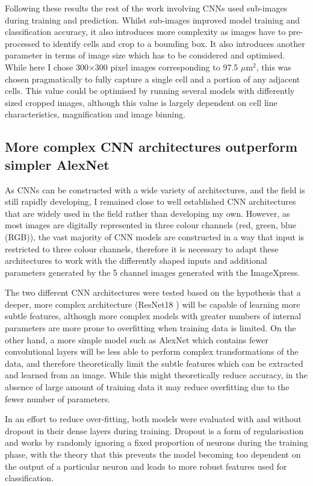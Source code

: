 \documentclass[a4paper,11pt,twoside,openright]{scrbook}
\begin{document}
Following these results the rest of the work involving CNNs used sub-images during training and prediction.
Whilst sub-images improved model training and classification accuracy, it also introduces more complexity as images have to pre-processed to identify cells and crop to a bounding box.
It also introduces another parameter in terms of image size which has to be considered and optimised.
While here I chose 300$\times$300 pixel images corresponding to 97.5 $\mu$m$^2$, this was chosen pragmatically to fully capture a single cell and a portion of any adjacent cells.
This value could be optimised by running several models with differently sized cropped images, although this value is largely dependent on cell line characteristics, magnification and image binning.


\subsection{More complex CNN architectures outperform simpler AlexNet}
As CNNs can be constructed with a wide variety of architectures, and the field is still rapidly developing, I remained close to well established CNN architectures that are widely used in the field rather than developing my own.
However, as most images are digitally represented in three colour channels (red, green, blue (RGB)), the vast majority of CNN models are constructed in a way that input is restricted to three colour channels, therefore it is necessary to adapt these architectures to work with the differently shaped inputs and additional parameters generated by the 5 channel images generated with the ImageXpress.

The two different CNN architectures were tested based on the hypothesis that a deeper, more complex architecture (ResNet18 \cite{He2015}) will be capable of learning more subtle features, although more complex models with greater numbers of internal parameters are more prone to overfitting when training data is limited.
On the other hand, a more simple model such as AlexNet \cite{Krizhevsky2012} which contains fewer convolutional layers will be less able to perform complex transformations of the data, and therefore theoretically limit the subtle features which can be extracted and learned from an image.
While this might theoretically reduce accuracy, in the absence of large amount of training data it may reduce overfitting due to the fewer number of parameters.

In an effort to reduce over-fitting, both models were evaluated with and without dropout in their dense layers during training.
Dropout is a form of regularisation and works by randomly ignoring a fixed proportion of neurons during the training phase, with the theory that this prevents the model becoming too dependent on the output of a particular neuron and leads to more robust features used for classification.
\end{document}
